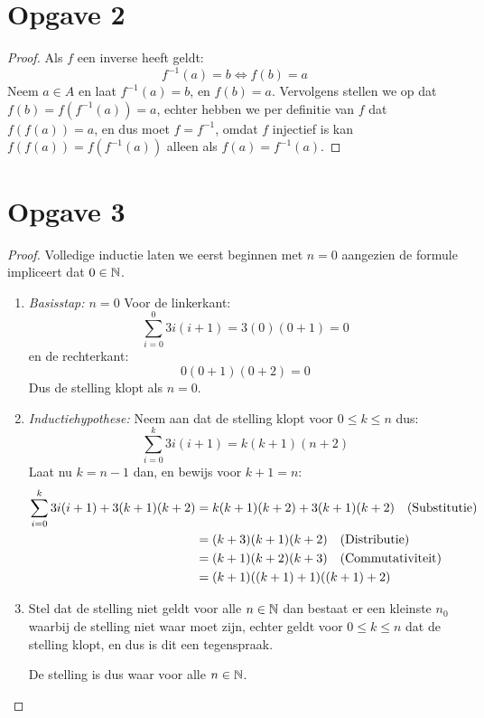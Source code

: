 \documentclass{article}
\begin{document}
\section*{Opgave 2}
\begin{proof}
Als $f$ een inverse heeft geldt: \[f^{-1}(a) = b \Leftrightarrow f(b) = a\] 
Neem $a \in A$
en laat $f^{-1}(a) = b$, en $f(b) = a$. 
Vervolgens stellen we op dat $f(b) = f(f^{-1}(a)) = a$,
echter hebben we per definitie van $f$ dat $f(f(a)) = a$, en dus moet $f = f^{-1}$, omdat $f$ injectief is
kan $f(f(a)) = f(f^{-1}(a))$ alleen als $f(a) = f^{-1}(a)$.
\end{proof}

\section*{Opgave 3}
\begin{proof}
	Volledige inductie laten we eerst beginnen met $n=0$ aangezien de formule impliceert dat $0 \in \mathbb{N}$.
	\begin{enumerate}
		\item \emph{Basisstap: $n = 0$}
		Voor de linkerkant:
			\[\sum_{i = 0}^{0}3i(i + 1) = 3(0)(0+1) = \boxed{0}\]
		en de rechterkant:	
			\[0(0+1)(0+2) = \boxed{0} \]
			Dus de stelling klopt als $n = 0$.
		\item \emph{Inductiehypothese:}
			Neem aan dat de stelling klopt voor $0 \leq k \leq n$ dus: 
			\[ \sum_{i = 0}^{k} 3i(i +1) = k(k+1)(n+2) \]
			Laat nu $k = n-1$ dan, en bewijs voor $k + 1 = n$:
			\begin{align*}
				\sum_{i= 0}^{k} 3i(i + 1) + 3(k+1)(k + 2) &= k(k+1)(k+2) + 3(k+1)(k+2) \quad (\text{Substitutie}) \\ 
				&= (k + 3)(k+1)(k+2) \quad (\text{Distributie}) \\
				&= (k + 1)(k+2)(k+3) \quad (\text{Commutativiteit}) \\
				&= (k + 1)((k+1) + 1)((k+1)+ 2)
			\end{align*}
		\item \emph{}
		Stel dat de stelling niet geldt voor alle $n \in \mathbb{N}$ dan bestaat er een kleinste $n_0$ waarbij de stelling niet waar moet zijn,
		echter geldt voor $0 \leq k \leq n$ dat de stelling klopt, en dus is dit een tegenspraak.
		
		De stelling is dus waar voor alle $n \in \mathbb{N}$.
	\end{enumerate}
\end{proof}
\end{document}
